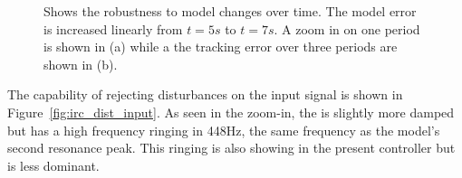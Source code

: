 \begin{figure}[h!]
  \centering %
  \qquad
  \caption{\label{fig:irc_dist} Shows the robustness to model changes over time. The model error is increased linearly from $t=5s$ to $t=7s$.  A zoom in on one period is shown in (a) while a the tracking error over three periods are shown in (b).}
\end{figure}

\FloatBarrier
The \abbrIRC capability of rejecting disturbances on the input signal is shown in Figure~\ref{fig:irc_dist_input}. As seen in the zoom-in, the \abbrIRC is slightly more damped but has a high frequency ringing in 448Hz, the same frequency as the model's second resonance peak. This ringing is also showing in the present controller but is less dominant.

